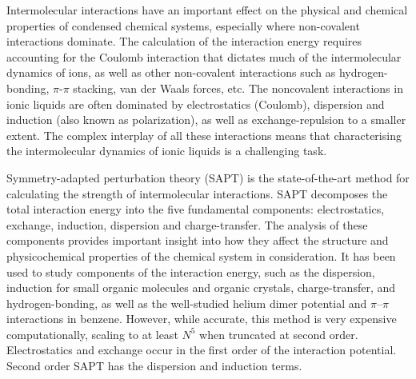 

Intermolecular interactions have an important effect on the physical and chemical properties of condensed chemical systems, especially where non-covalent interactions dominate. 
The calculation of the interaction energy requires accounting for the Coulomb interaction that dictates much of the intermolecular dynamics of ions, as well as other non-covalent interactions such as hydrogen-bonding, $\pi$-$\pi$ stacking, van der Waals forces, etc.
\cite{Wendler2012a, Bedrov2010a, Izgorodina2011a}
The noncovalent interactions in ionic liquids are often dominated by electrostatics (Coulomb), dispersion and induction (also known as polarization), as well as exchange-repulsion to a smaller extent. 
\cite{Izgorodina2011b, Izgorodina2014a}
The complex interplay of all these interactions means that characterising the intermolecular dynamics of ionic liquids is a challenging task. 
\cite{Izgorodina2011a}



Symmetry-adapted perturbation theory (SAPT)
\cite{Misquitta2008a, Misquitta2008b, Parker2014a}
is the state-of-the-art method for calculating the strength of intermolecular interactions.
SAPT decomposes the total interaction energy into the five fundamental components: electrostatics, exchange, induction, dispersion and charge-transfer.
The analysis of these components provides important insight into how they affect the structure and physicochemical properties of the chemical system in consideration.
\cite{Stone1996a, Turney2012a}
It has been used to study components of the interaction energy, such as the dispersion,
\cite{Misquitta2005a} 
induction for small organic molecules and organic crystals,
\cite{Misquitta2008a, Misquitta2008b, Welch2008a}
charge-transfer,
\cite{Karthikeyan2011a}
and hydrogen-bonding,
\cite{Milet1999a}
as well as the well-studied helium dimer potential
\cite{Korona1997a}
and $\pi \text{--} \pi$ interactions in benzene.
\cite{Sinnokrot2004a, Sinnokrot2006a}
However, while accurate, this method is very expensive computationally, scaling to at least $N^5$ when truncated at second order.
Electrostatics and exchange occur in the first order of the interaction potential. 
Second order SAPT has the dispersion and induction terms.



